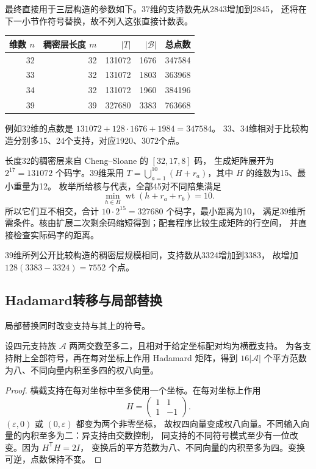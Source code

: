最终直接用于三层构造的参数如下。37维的支持数先从2843增加到2845，
还将在下一小节作符号替换，故不列入这张直接计数表。
\begin{center}
\begin{minipage}{\linewidth}\centering
{}
\label{tab:code-parameters}
\begin{tabular}{rrrrr}
\toprule
维数 $n$ & 稠密层长度 $m$ & $|T|$ & $|\mathcal B|$ & 总点数\\
\midrule
32&32&131072&1676&347584\\
33&32&131072&1803&363968\\
34&32&131072&1960&384196\\
39&39&327680&3383&763668\\
\bottomrule
\end{tabular}
\end{minipage}
\end{center}
例如32维的点数是
$131072+128\cdot1676+1984=347584$。
33、34维相对于比较构造分别多15、24个支持，对应1920、3072个点。

长度32的稠密层来自 Cheng--Sloane 的 $[32,17,8]$ 码\cite{chengsloane}，
生成矩阵展开为 $2^{17}=131072$ 个码字。39维采用
$T=\bigcup_{a=1}^{10}(H+r_a)$，其中 $H$ 的维数为15、最小重量为12。
枚举所给核与代表，全部45对不同陪集满足
\[
\min_{h\in H}\operatorname{wt}(h+r_a+r_b)=10.
\]
所以它们互不相交，合计 $10\cdot2^{15}=327680$ 个码字，最小距离为10，
满足39维所需条件。核由扩展二次剩余码缩短得到；配套程序比较生成矩阵的行空间，
并直接检查实际码字的距离。

39维所列公开比较构造的稠密层规模相同，支持数从3324增加到3383，
故增加 $128(3383-3324)=7552$ 个点。

\subsection{Hadamard转移与局部替换}

局部替换同时改变支持与其上的符号。

\begin{proposition}[配对 Hadamard 转移]
\label{prop:hadamard}
设四元支持族 $\mathcal A$ 两两交数至多二，且相对于给定坐标配对均为横截支持。
为各支持附上全部符号，再在每对坐标上作用 Hadamard 矩阵，得到
$16|\mathcal A|$ 个平方范数为八、不同向量内积至多四的权八向量。
\end{proposition}
\begin{proof}
横截支持在每对坐标中至多使用一个坐标。在每对坐标上作用
\[
H=\begin{pmatrix}1&1\\1&-1\end{pmatrix}.
\]
$(\varepsilon,0)$ 或 $(0,\varepsilon)$ 都变为两个非零坐标，
故权四向量变成权八向量。不同输入向量的内积至多为二：异支持由交数控制，
同支持的不同符号模式至少有一位改变。因为 $H^{\mathsf T}H=2I$，
变换后的平方范数为八、不同向量的内积至多为四。变换可逆，点数保持不变。
\end{proof}

